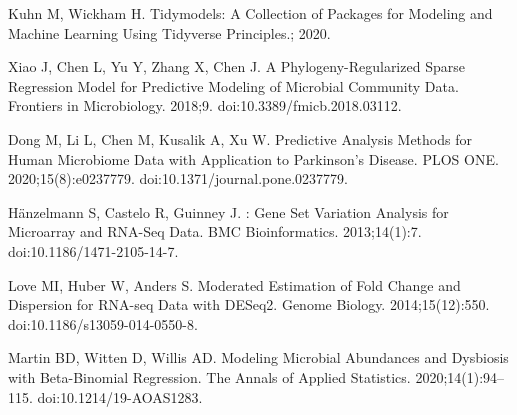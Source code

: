 \documentclass{article}
\begin{document}
\begin{thebibliography}{10}
Kuhn M, Wickham H. Tidymodels: A Collection of Packages for Modeling and
  Machine Learning Using Tidyverse Principles.; 2020.

Xiao J, Chen L, Yu Y, Zhang X, Chen J.
\newblock A {{Phylogeny-Regularized Sparse Regression Model}} for {{Predictive
  Modeling}} of {{Microbial Community Data}}.
\newblock Frontiers in Microbiology. 2018;9.
\newblock doi:{10.3389/fmicb.2018.03112}.

Dong M, Li L, Chen M, Kusalik A, Xu W.
\newblock Predictive Analysis Methods for Human Microbiome Data with
  Application to {{Parkinson}}'s Disease.
\newblock PLOS ONE. 2020;15(8):e0237779.
\newblock doi:{10.1371/journal.pone.0237779}.

H{\"a}nzelmann S, Castelo R, Guinney J.
: Gene Set Variation Analysis for Microarray and {{RNA-Seq}}
  Data.
\newblock BMC Bioinformatics. 2013;14(1):7.
\newblock doi:{10.1186/1471-2105-14-7}.

Love MI, Huber W, Anders S.
\newblock Moderated Estimation of Fold Change and Dispersion for {{RNA-seq}}
  Data with {{DESeq2}}.
\newblock Genome Biology. 2014;15(12):550.
\newblock doi:{10.1186/s13059-014-0550-8}.

Martin BD, Witten D, Willis AD.
\newblock Modeling Microbial Abundances and Dysbiosis with Beta-Binomial
  Regression.
\newblock The Annals of Applied Statistics. 2020;14(1):94--115.
\newblock doi:{10.1214/19-AOAS1283}.

\end{thebibliography}


\end{document}
